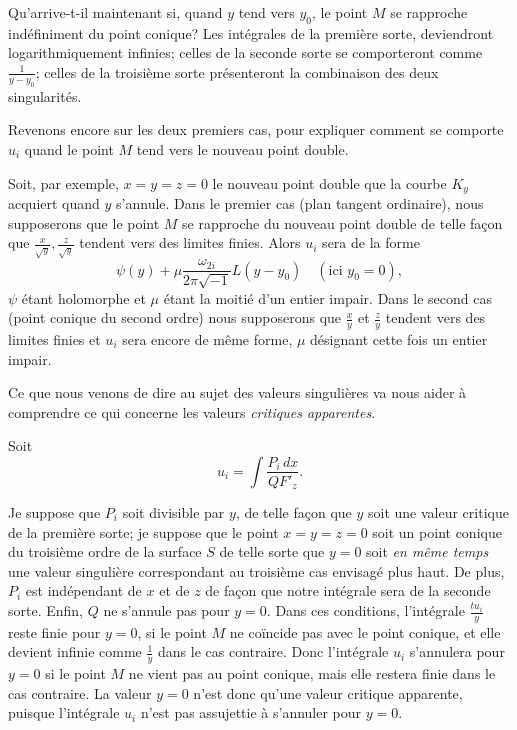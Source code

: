 \documentclass{article}
\begin{document}
Qu'arrive-t-il maintenant si, quand $y$ tend vers $y_{0}$, le point $M$ se rapproche indéfiniment du point conique? Les intégrales de la première sorte, deviendront logarithmiquement infinies; celles de la seconde sorte se comporteront comme $\frac{1}{y - y_{0}}$; celles de la troisième sorte présenteront la combinaison des deux singularités.

Revenons encore sur les deux premiers cas, pour expliquer comment se comporte $u_{i}$ quand le point $M$ tend vers le nouveau point double.

Soit, par exemple, $x = y = z = 0$ le nouveau point double que la courbe $K_{y}$ acquiert quand $y$ s'annule. Dans le premier cas (plan tangent ordinaire), nous supposerons que le point $M$ se rapproche du nouveau point double de telle façon que $\frac{x}{\sqrt{y}}, \frac{z}{\sqrt{y}}$ tendent vers des limites finies. Alors $u_{i}$ sera de la forme
\[
\psi(y) + \mu \frac{\omega_{2i}}{2\pi\sqrt{-1}} L(y - y_{0}) \quad (\text{ici } y_{0} = 0),
\]
$\psi$ étant holomorphe et $\mu$ étant la moitié d'un entier impair. Dans le second cas (point conique du second ordre) nous supposerons que $\frac{x}{y}$ et $\frac{z}{y}$ tendent vers
des limites finies et $u_{i}$ sera encore de même forme, $\mu$ désignant cette fois un entier impair.

Ce que nous venons de dire au sujet des valeurs singulières va nous aider à comprendre ce qui concerne les valeurs \emph{critiques apparentes}.

Soit
\[
u_{i} = \int \frac{P_{i}\,dx}{Q F'_{z}}.
\]

Je suppose que $P_{i}$ soit divisible par $y$, de telle façon que $y$ soit une valeur critique de la première sorte; je suppose que le point $x = y = z = 0$ soit un point conique du troisième ordre de la surface $S$ de telle sorte que $y = 0$ soit \emph{en même temps} une valeur singulière correspondant au troisième cas envisagé plus haut. De plus, $P_{i}$ est indépendant de $x$ et de $z$ de façon que notre intégrale sera de la seconde sorte. Enfin, $Q$ ne s'annule pas pour $y = 0$. Dans ces conditions, l'intégrale $\frac{t u_{i}}{y}$ reste finie pour $y = 0$, si le point $M$ ne coïncide pas avec le point conique, et elle devient infinie comme $\frac{1}{y}$ dans le cas contraire. Donc l'intégrale $u_{i}$ s'annulera pour $y = 0$ si le point $M$ ne vient pas au point conique, mais elle restera finie dans le cas contraire. La valeur $y = 0$ n'est donc qu'une valeur critique apparente, puisque l'intégrale $u_{i}$ n'est pas assujettie à s'annuler pour $y = 0$.
\end{document}
